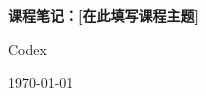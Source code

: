 \documentclass[a4paper]{article}
\newcommand{\notetitle}{课程笔记：[在此填写课程主题]}
\newcommand{\noteauthors}{Codex}
\newcommand{\notedate}{\today}
\begin{document}
\begin{titlepage}
\centering
\vspace*{0.28\textheight}
{\huge\bfseries \notetitle\par}
\vspace{0.8cm}
{\large \noteauthors\par}
\vspace{0.3cm}
{\large \notedate\par}
\vfill
\end{titlepage}

\tableofcontents
\newpage


%

\end{document}
